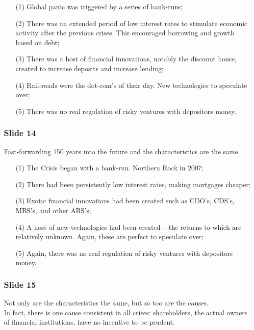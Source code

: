 \documentclass[a4paper, 11pt]{article} %
\begin{document}
\begin{itemize}
\item[(1)] Global panic was triggered by a series of bank-runs;
\item[(2)] There was an extended period of low interest rates to stimulate economic activity after the previous crises. This encouraged borrowing and growth based on debt;
\item[(3)] There was a host of financial innovations, notably the discount house, created to increase deposits and increase lending;
\item[(4)] Rail-roads were the dot-com's of their day. New technologies to speculate over;
\item[(5)] There was no real regulation of risky ventures with depositors money.
\end{itemize}




\subsubsection*{Slide 14}

Fast-forwarding 150 years into the future and the characteristics are the same.

\begin{itemize}
\item[(1)] The Crisis began with a bank-run. Northern Rock in 2007;
\item[(2)] There had been persistently low interest rates, making mortgages cheaper;
\item[(3)] Exotic financial innovations had been created such as CDO's, CDS's, MBS's, and other ABS's;
\item[(4)] A host of new technologies had been created -- the returns to which are relatively unknown. Again, these are perfect to speculate over;
\item[(5)] Again, there was no real regulation of risky ventures with depositors money.
\end{itemize}


\subsubsection*{Slide 15}

Not only are the characteristics the same, but so too are the causes.\\

In fact, there is one cause consistent in all crises: shareholders, the actual owners of financial institutions, have no incentive to be prudent.\\
\end{document}
